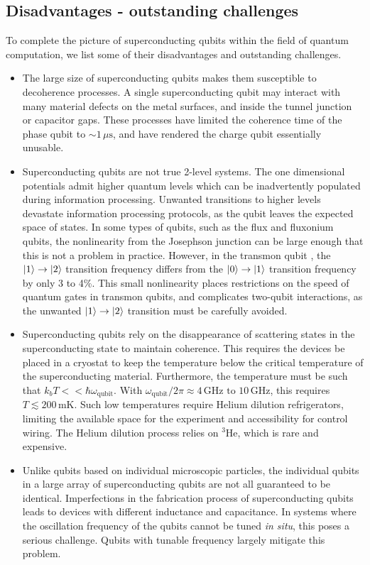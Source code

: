 \subsection{Disadvantages - outstanding challenges}

To complete the picture of superconducting qubits within the field of quantum computation, we list some of their disadvantages and outstanding challenges.

\begin{itemize}
\item The large size of superconducting qubits makes them susceptible to decoherence processes.
A single superconducting qubit may interact with many material defects on the metal surfaces, and inside the tunnel junction or capacitor gaps.
These processes have limited the coherence time of the phase qubit to $\sim 1\,\mu\text{s}$, and have rendered the charge qubit essentially unusable.

\item Superconducting qubits are not true 2-level systems.
The one dimensional potentials admit higher quantum levels which can be inadvertently populated during information processing.
Unwanted transitions to higher levels devastate information processing protocols, as the qubit leaves the expected space of states.
In some types of qubits, such as the flux and fluxonium qubits, the nonlinearity from the Josephson junction can be large enough that this is not a problem in practice.
However, in the transmon qubit \cite{Koch:transmon2007}, the $|1\rangle\rightarrow|2\rangle$ transition frequency differs from the $|0\rangle\rightarrow|1\rangle$ transition frequency by only 3 to 4\%.
This small nonlinearity places restrictions on the speed of quantum gates in transmon qubits, and complicates two-qubit interactions, as the unwanted $|1\rangle\rightarrow|2\rangle$ transition must be carefully avoided.

\item Superconducting qubits rely on the disappearance of scattering states in the superconducting state to maintain coherence.
This requires the devices be placed in a cryostat to keep the temperature below the critical temperature of the superconducting material.
Furthermore, the temperature must be such that $k_b T << \hbar \omega_{\text{qubit}}$.
With $\omega_{\text{qubit}}/2\pi \approx 4\,\text{GHz}\text{ to }10\,\text{GHz}$, this requires $T\lesssim 200\,\text{mK}$.
Such low temperatures require Helium dilution refrigerators, limiting the available space for the experiment and accessibility for control wiring.
The Helium dilution process relies on $^3 \text{He}$, which is rare and expensive.

\item Unlike qubits based on individual microscopic particles, the individual qubits in a large array of superconducting qubits are not all guaranteed to be identical.
Imperfections in the fabrication process of superconducting qubits leads to devices with different inductance and capacitance.
In systems where the oscillation frequency of the qubits cannot be tuned \emph{in situ}, this poses a serious challenge.
Qubits with tunable frequency largely mitigate this problem.
\end{itemize}

